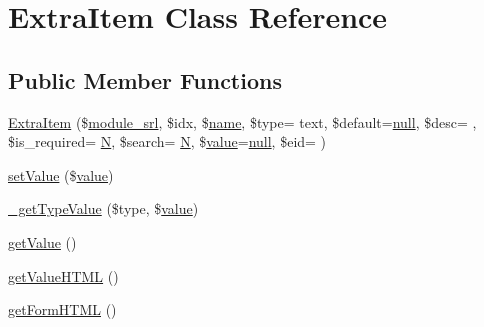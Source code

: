 \hypertarget{classExtraItem}{}\section{Extra\+Item Class Reference}
\label{classExtraItem}
\subsection*{Public Member Functions}
\begin{DoxyCompactItemize}
\item 
\hyperlink{classExtraItem_abdf34ec801688507ddbc1acd513d2f8d}{Extra\+Item} (\$\hyperlink{ko_8install_8php_a370bb6450fab1da3e0ed9f484a38b761}{module\+\_\+srl}, \$idx, \$\hyperlink{common_8js_a22c29d2aa8ed6161ce8faa718ef76e68}{name}, \$type= \textquotesingle{}text\textquotesingle{}, \$default=\hyperlink{modernizr_8min_8js_a286f9ec831c5e676eeb493248eab9575}{null}, \$desc= \textquotesingle{}\textquotesingle{}, \$is\+\_\+required= \textquotesingle{}\hyperlink{jquery-1_8x_8min_8js_ab8a5cba0bbaa18ec7f830663874cb9d0}{N}\textquotesingle{}, \$search= \textquotesingle{}\hyperlink{jquery-1_8x_8min_8js_ab8a5cba0bbaa18ec7f830663874cb9d0}{N}\textquotesingle{}, \$\hyperlink{jquery_8js_abe5393d870043cf6aaa1d5ad5fce755c}{value}=\hyperlink{modernizr_8min_8js_a286f9ec831c5e676eeb493248eab9575}{null}, \$eid= \textquotesingle{}\textquotesingle{})
\item 
\hyperlink{classExtraItem_a6bec289dc0622bd882a36cb9b5680b03}{set\+Value} (\$\hyperlink{jquery_8js_abe5393d870043cf6aaa1d5ad5fce755c}{value})
\item 
\hyperlink{classExtraItem_ac285a098cdd05b2c152b3d94c8cb95db}{\+\_\+get\+Type\+Value} (\$type, \$\hyperlink{jquery_8js_abe5393d870043cf6aaa1d5ad5fce755c}{value})
\item 
\hyperlink{classExtraItem_a61ff542aa57144ac9e8d20d40f426486}{get\+Value} ()
\item 
\hyperlink{classExtraItem_a7784f081919e81e4a41ab0c250d6ca52}{get\+Value\+H\+T\+ML} ()
\item 
\hyperlink{classExtraItem_aaedac8843abdf391e8f4d22704606898}{get\+Form\+H\+T\+ML} ()
\end{DoxyCompactItemize}
